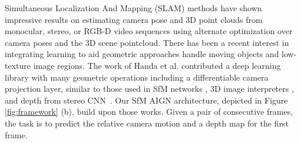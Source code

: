 \documentclass[10pt,twocolumn,letterpaper]{article}
\begin{document}
\begin{bibunit}[ieee]
Simultaneous Localization And Mapping (SLAM)  methods have shown impressive results on estimating camera pose and 3D point clouds from monocular, stereo, or RGB-D video sequences \cite{schoeps14ismar,kerl13iros} using alternate optimization over camera poses and the 3D scene pointcloud. 
There has been a recent interest in integrating learning to aid  geometric approaches handle moving objects and low-texture image regions. The work of Handa et al. \cite{handa2016gvnn} contributed a  deep learning library with many geometric operations including a differentiable camera projection layer, similar to those used in SfM networks \cite{sfmnet,tinghuisfm}, 3D image interpreters \cite{interpreter}, and  depth from stereo  CNN~\cite{garg2016unsupervised}. Our SfM AIGN architecture, depicted in Figure \ref{fig:framework} (b), build upon those works. Given a pair of consecutive frames, the task is to predict the relative camera motion and a  depth map for the first frame.


\end{bibunit}
\end{document}
